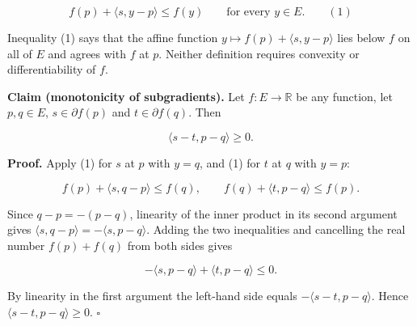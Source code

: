 \documentclass[11pt,a4paper]{article}
\begin{document}
\[f(p)+\langle s,y-p\rangle\le f(y)\qquad\text{for every }y\in E.\qquad(1)\]


Inequality (1) says that the affine function \(y\mapsto f(p)+\langle s,y-p\rangle\) lies below \(f\) on all of \(E\) and agrees with \(f\) at \(p\). Neither definition requires convexity or differentiability of \(f\).




\textbf{Claim (monotonicity of subgradients).} Let \(f:E\to\mathbb R\) be any function, let \(p,q\in E\), \(s\in\partial f(p)\) and \(t\in\partial f(q)\). Then


\[\langle s-t,p-q\rangle\ge0.\]


\textbf{Proof.} Apply (1) for \(s\) at \(p\) with \(y=q\), and (1) for \(t\) at \(q\) with \(y=p\):


\[f(p)+\langle s,q-p\rangle\le f(q),\qquad f(q)+\langle t,p-q\rangle\le f(p).\]


Since \(q-p=-(p-q)\), linearity of the inner product in its second argument gives \(\langle s,q-p\rangle=-\langle s,p-q\rangle\). Adding the two inequalities and cancelling the real number \(f(p)+f(q)\) from both sides gives


\[-\langle s,p-q\rangle+\langle t,p-q\rangle\le0.\]


By linearity in the first argument the left-hand side equals \(-\langle s-t,p-q\rangle\). Hence \(\langle s-t,p-q\rangle\ge0\). \(\square\)
\end{document}
